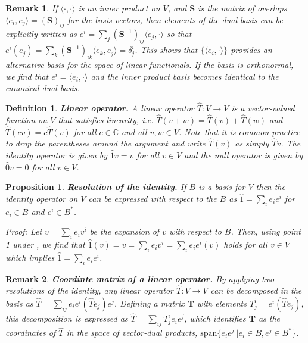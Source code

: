 \documentclass[11pt,fleqn]{article}
\renewcommand{\d}{\delta}    %
\newcommand{\op}[1]{\ensuremath{\hat{#1}}}
\newcommand{\spn}{\ensuremath{\mathrm{span}}}
\newcommand{\bmit}[1]{{\bfseries\itshape\mathversion{bold}#1}}
\newcommand{\mb}[1]{\ensuremath{\mathbb{#1}}}
\newcommand{\bo}[1]{\ensuremath{\mathbf{#1}}}
\newcommand{\ip}[1]{\ensuremath{\langle#1\rangle}}
\theoremstyle{mystyle}
\newtheorem{dfn}{Definition}
\newtheorem{rmk}{Remark}
\newtheorem{pro}{Proposition}
\numberwithin{equation}{section}
\begin{document}
\begin{rmk}
If $\ip{\cdot,\cdot}$ is an inner product on $V$, and $\bo{S}$ is the matrix of overlaps $\ip{e_i,e_j}=(\bo{S})_{ij}$ for the basis vectors, then elements of the dual basis can be explicitly written as $e^i=\sum_j(\bo{S}^{-1})_{ij}\ip{e_j,\cdot}$ so that $e^i(e_j)=\sum_k(\bo{S}^{-1})_{ik}\ip{e_k,e_j}=\d_j^i$.
This shows that $\{\ip{e_i,\cdot}\}$ provides an alternative basis for the space of linear functionals.
If the basis is orthonormal, we find that $e^i=\ip{e_i,\cdot}$ and the inner product basis becomes identical to the canonical dual basis.
\end{rmk}

\begin{dfn}
\bmit{Linear operator.}
A \textit{linear operator} $\op{T}:V\rightarrow V$ is a vector-valued function on $V$ that satisfies linearity, i.e. $\op{T}(v+w)=\op{T}(v)+\op{T}(w)$ and $\op{T}(cv)=c\op{T}(v)$ for all $c\in\mb{C}$ and all $v,w\in V$.
Note that it is common practice to drop the parentheses around the argument and write  $\op{T}(v)$ as simply $\op{T}v$.
The \textit{identity operator} is given by $\op{1}v=v$ for all $v\in V$ and the \textit{null operator} is given by $\op{0}v=0$ for all $v\in V$.
\end{dfn}

\begin{pro}
\label{resolution-of-the-identity}
\bmit{Resolution of the identity.}
\textit{If $B$ is a basis for $V$ then the identity operator on $V$ can be expressed with respect to the $B$ as $\op{1}=\sum_i e_ie^i$ for $e_i\in B$ and $e^i\in B^*$.}
\vspace{5pt}
\begin{addmargin}[1em]{0em}
Proof: Let $v=\sum_ie_iv^i$ be the expansion of $v$ with respect to $B$.
Then, using point 1 under , we find that $\op{1}(v)=v=\sum_ie_iv^i=\sum_ie_ie^i(v)$ holds for all $v\in V$ which implies $\op{1}=\sum_ie_ie^i$.
\end{addmargin}
\end{pro}

\begin{rmk}
\label{coordinate-matrix}
\bmit{Coordinte matrix of a linear operator.}
By applying two resolutions of the identity, any linear operator $\op{T}:V\rightarrow V$ can be decomposed in the basis as
$
  \op{T}
=
  \sum_{ij}
  e_ie^i(\op{T}e_j)e^j
$.
Defining a matrix $\bo{T}$ with elements $T_j^i=e^i(\op{T}e_j)$, this decomposition is expressed as
$
  \op{T}
=
  \sum_{ij}
  T_j^i
  e_ie^j
$,
which identifies $\bo{T}$ as the \textit{coordinates} of $\op{T}$ in the space of vector-dual products, $\spn\{e_ie^j\ | e_i\in B, e^j\in B^*\}$.
\end{rmk}
\end{document}

